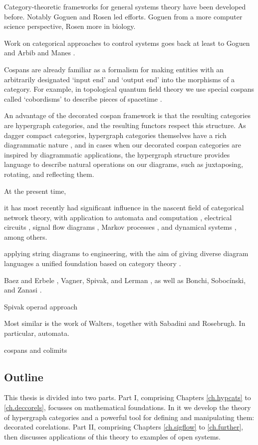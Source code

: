 Category-theoretic frameworks for general systems theory have been developed
before. Notably Goguen and Rosen led efforts. Goguen from a more computer
science perspective, Rosen more in biology.


Work on categorical approaches to control systems goes back at least to Goguen
\cite{Go} and Arbib and Manes \cite{AM}. 



Cospans are already familiar as a formalism for making entities with an
arbitrarily designated `input end' and `output end' into the morphisms of a
category.  For example, in topological quantum field theory we use special
cospans called `cobordisms' to describe pieces of spacetime \cite{BL,BaezStay}.

An advantage of the decorated cospan framework is that the resulting categories
are hypergraph categories, and the resulting functors respect this structure.
As dagger compact categories, hypergraph categories themselves have a rich
diagrammatic nature \cite{Sel11}, and in cases when our decorated cospan categories
are inspired by diagrammatic applications, the hypergraph structure provides
language to describe natural operations on our diagrams, such as juxtaposing,
rotating, and reflecting them.

At the present time, 

it has most recently had
significant influence in the nascent field of categorical network theory, with
application to automata and computation \cite{KSW2, Sp}, electrical circuits
\cite{BF}, signal flow diagrams \cite{BSZ, BE}, Markov processes \cite{BFP,
ASW}, and dynamical systems \cite{VSL}, among others. 

applying string diagrams to engineering, with the aim of
giving diverse diagram languages a unified foundation based on category theory
\cite{KSW,RSW05}. 

Baez and Erbele
\cite{BE}, Vagner, Spivak, and Lerman \cite{VSL}, as well as Bonchi,
Soboc\'inski, and Zanasi \cite{BSZ,BSZ2,BSZ3,Za}. 


Spivak operad approach

Most similar is the work of Walters, together with Sabadini and Rosebrugh. In
particular, automata.

cospans and colimits







\subsection*{Outline}
This thesis is divided into two parts. Part I, comprising Chapters
\ref{ch.hypcats} to \ref{ch.deccorels}, focusses on mathematical foundations. In
it we develop the theory of hypergraph categories and a powerful tool for
defining and manipulating them: decorated corelations. Part II, comprising
Chapters \ref{ch.sigflow} to \ref{ch.further}, then discusses applications of
this theory to examples of open systems.

